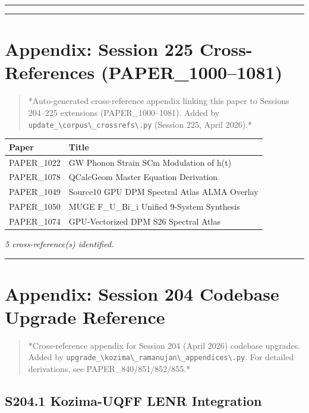 \documentclass[12pt,a4paper]{article}
\begin{document}
\medskip\hrule\medskip

\medskip\hrule\medskip

\section{Appendix: Session 225 Cross-References (PAPER\_1000--1081)}

\begin{quote}
*Auto-generated cross-reference appendix linking this paper to
Sessions 204--225 extensions (PAPER\_1000--1081). Added by
\texttt{update\_\textbackslash {corpus\textbackslash \_crossrefs\textbackslash }.py} (Session 225, April 2026).*
\end{quote}

\begin{table}[H]
\centering
\small
\begin{tabularx}{\linewidth}{@{}>{\raggedright\arraybackslash}X>{\raggedright\arraybackslash}X@{}}
\toprule
Paper & Title \tabularnewline
\midrule
PAPER\_1022 & GW Phonon Strain SCm Modulation of h(t) \tabularnewline
PAPER\_1078 & QCalcGeom Master Equation Derivation \tabularnewline
PAPER\_1049 & Source10 GPU DPM Spectral Atlas ALMA Overlay \tabularnewline
PAPER\_1050 & MUGE F\_{U\_Bi\_i} Unified 9-System Synthesis \tabularnewline
PAPER\_1074 & GPU-Vectorized DPM S26 Spectral Atlas \tabularnewline
\bottomrule
\end{tabularx}
\end{table}

\emph{5 cross-reference(s) identified.}

\medskip\hrule\medskip

\section{Appendix: Session 204 Codebase Upgrade Reference}

\begin{quote}
*Cross-reference appendix for Session 204 (April 2026) codebase upgrades.
Added by \texttt{upgrade\_\textbackslash {kozima\textbackslash \_ramanujan\textbackslash \_appendices\textbackslash }.py}. For detailed derivations,
see PAPER\_840/851/852/855.*
\end{quote}

\subsection{S204.1 Kozima-UQFF LENR Integration}
\end{document}
